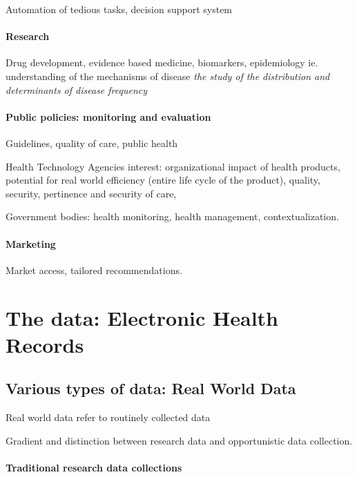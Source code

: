 \documentclass{report}
\begin{document}
Automation of tedious tasks, decision support system

\paragraph{Research}

Drug development, evidence based medicine, biomarkers, epidemiology ie.
understanding of the mechanisms of disease \textit{the study of the distribution
  and determinants of disease frequency} \citep{macmahon1970epidemiology}

\paragraph{Public policies: monitoring and evaluation}

Guidelines, quality of care, public health

Health Technology Agencies interest: organizational impact of health products,
potential for real world efficiency (entire life cycle of the product), quality,
security, pertinence and security of care,

Government bodies: health monitoring, health management, contextualization.

\paragraph{Marketing}

Market access, tailored recommendations.

\section{The data: Electronic Health Records}\label{sec:intro:data}

\subsection{Various types of data: Real World Data}\label{subsec:intro:real_world_data}

Real world data refer to routinely collected data

Gradient and distinction between research data and opportunistic data
collection.

\paragraph{Traditional research data collections}
\end{document}
